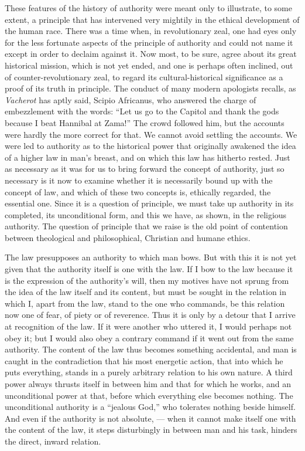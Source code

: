 \documentclass[12pt,a4paper,openany]{book}
\newcommand{\opage}[1]{\marginnote{\footnotesize\textit{[#1]}}}
\begin{document}
These features of the history of authority were meant only to illustrate, to
some extent, a principle that has intervened very mightily in the ethical
development of the human race. There was a time when, in revolutionary zeal,
one had eyes only for the less fortunate aspects of the principle of authority
and could not name it except in order to declaim against it. Now most, to be
sure, agree about its great historical mission, which \opage{68}is not yet
ended, and one is perhaps often inclined, out of counter-revolutionary zeal,
to regard its cultural-historical significance as a proof of its truth in
principle. The conduct of many modern apologists recalls, as \emph{Vacherot}
has aptly said, Scipio Africanus, who answered the charge of embezzlement with
the words: ``Let us go to the Capitol and thank the gods because I beat
Hannibal at Zama!'' The crowd followed him, but the accounts were hardly the
more correct for that. We cannot avoid settling the accounts. We were led to
authority as to the historical power that originally awakened the idea of a
higher law in man's breast, and on which this law has hitherto rested. Just as
necessary as it was for us to bring forward the concept of authority, just so
necessary is it now to examine whether it is necessarily bound up with the
concept of law, and which of these two concepts is, ethically regarded, the
essential one. Since it is a question of principle, we must take up authority
in its completed, its unconditional form, and this we have, as shown, in the
religious authority. The question of principle that we raise is the old point
of contention between theological and philosophical, Christian and humane
ethics.

The law presupposes an authority to which man bows. But with this it is not
yet given that the authority itself is one with the law. If I bow to the law
because it is the expression of the authority's will, then my motives have not
sprung from the idea of the law itself \opage{69}and its content, but must be
sought in the relation in which I, apart from the law, stand to the one who
commands, be this relation now one of fear, of piety or of reverence. Thus it
is only by a detour that I arrive at recognition of the law. If it were
another who uttered it, I would perhaps not obey it; but I would also obey a
contrary command if it went out from the same authority. The content of the
law thus becomes something accidental, and man is caught in the contradiction
that his most energetic action, that into which he puts everything, stands in
a purely arbitrary relation to his own nature. A third power always thrusts
itself in between him and that for which he works, and an unconditional power
at that, before which everything else becomes nothing. The unconditional
authority is a ``jealous God,'' who tolerates nothing beside himself. And even
if the authority is not absolute, --- when it cannot make itself one with the
content of the law, it steps disturbingly in between man and his task, hinders
the direct, inward relation.
\end{document}
